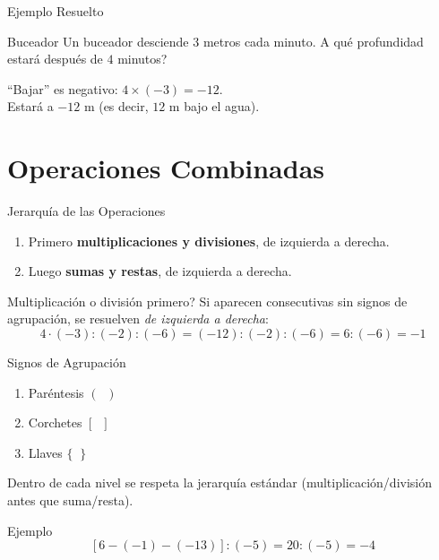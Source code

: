\documentclass[aspectratio=169]{beamer}
\begin{document}
\begin{frame}{Ejemplo Resuelto}
  \begin{block}{Buceador}
    Un buceador desciende $3$ metros cada minuto. \textquestiondown A qué profundidad estará después de $4$ minutos?
  \end{block}
  \vspace{6pt}
  \begin{mwextra}[Solución]
    ``Bajar'' es negativo: \quad $4 \times (-3) = -12$.\\[4pt]
    Estará a $-12$ m (es decir, $12$ m bajo el agua).
  \end{mwextra}
\end{frame}

\section{Operaciones Combinadas}

\begin{frame}{Jerarquía de las Operaciones}
  \begin{mwpasos}
    \begin{enumerate}
      \item Primero \textbf{multiplicaciones y divisiones}, de izquierda a derecha.
      \item Luego \textbf{sumas y restas}, de izquierda a derecha.
    \end{enumerate}
  \end{mwpasos}
  \vspace{6pt}
  \begin{alertblock}{\textquestiondown Multiplicación o división primero?}
    Si aparecen consecutivas sin signos de agrupación, se resuelven \emph{de izquierda a derecha}:
    \[
      4 \cdot (-3) : (-2) : (-6) = (-12) : (-2) : (-6) = 6 : (-6) = -1
    \]
  \end{alertblock}
\end{frame}

\begin{frame}{Signos de Agrupación}
  \begin{mwpasos}
    \begin{enumerate}
      \item Paréntesis \quad $(\;\;)$
      \item Corchetes \quad $[\;\;]$
      \item Llaves \quad $\{\;\;\}$
    \end{enumerate}
    Dentro de cada nivel se respeta la jerarquía estándar (multiplicación/división antes que suma/resta).
  \end{mwpasos}
  \vspace{6pt}
  \begin{exampleblock}{Ejemplo}
    \[
      [6 - (-1) - (-13)] : (-5) = 20 : (-5) = -4
    \]
  \end{exampleblock}
\end{frame}
\end{document}
